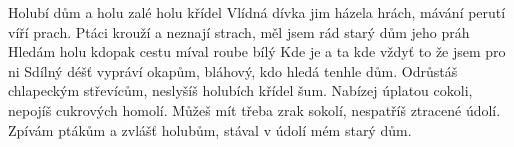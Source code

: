 \begin{TEXT}{Holubí dům}
\SLOKA {}  a  holu\NL
{}   \NL
{}  zalé\NL
{}   holu křídel 
\SLOKA Vlídná dívka jim házela hrách,\NL
   mávání perutí víří prach.\NL
   Ptáci krouží a neznají strach,\NL
   měl jsem rád starý dům jeho práh
\REFREN Hledám  holu kdopak  cestu  \NL
míval  roube bílý \NL
Kde je  a ta  kde \NL
vždyť to  že jsem  pro ni 
\SLOKA Sdílný déšť vypráví okapům,\NL
   bláhový, kdo hledá tenhle dům.\NL
   Odrůstáš chlapeckým střevícům,\NL
   neslyšíš holubích křídel šum.
\SLOKA Nabízej úplatou cokoli,\NL
   nepojíš cukrových homolí.\NL
   Můžeš mít třeba zrak sokolí,\NL
   nespatříš ztracené údolí.
\REFREN Zpívám ptákům a zvlášť holubům,\NL
stával v údolí mém starý dům.
\end{TEXT}
